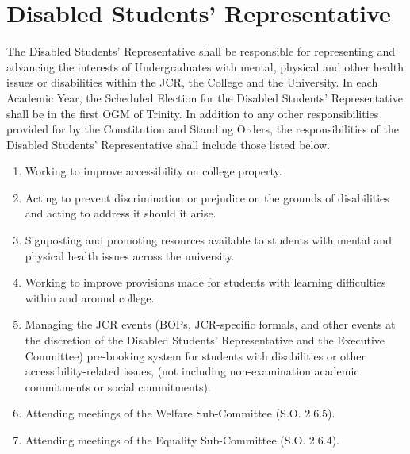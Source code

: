 \section{Disabled Students' Representative}
\npara The Disabled Students' Representative shall be responsible for representing and advancing the interests of Undergraduates with mental, physical and other health issues or disabilities within the JCR, the College and the University. 
\npara In each Academic Year, the Scheduled Election for the Disabled Students' Representative shall be in the first OGM of Trinity.
\npara In addition to any other responsibilities provided for by the Constitution and Standing Orders, the responsibilities of the Disabled Students' Representative shall include those listed below.
\begin{enumerate}
	\item Working to improve accessibility on college property.
	\item Acting to prevent discrimination or prejudice on the grounds of disabilities and acting to address it should it arise.
	\item Signposting and promoting resources available to students with mental and physical health issues across the university.
	\item Working to improve provisions made for students with learning difficulties within and around college.
	\item Managing the JCR events (BOPs, JCR-specific formals, and other events at the discretion of the Disabled Students' Representative and the Executive Committee) pre-booking system for students with disabilities or other accessibility-related issues, (not including non-examination academic commitments or social commitments).
	\item Attending meetings of the Welfare Sub-Committee (S.O. 2.6.5).
	\item Attending meetings of the Equality Sub-Committee (S.O. 2.6.4).
\end{enumerate}
